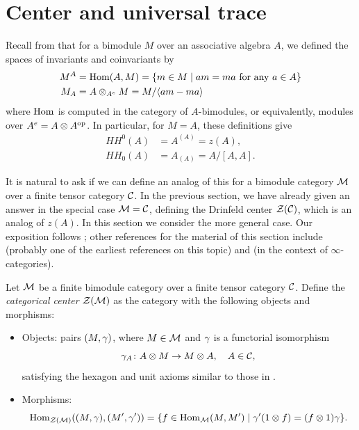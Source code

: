 \section{Center and universal trace}\label{s:cat-trace}
Recall from  that for a bimodule $M$ over an associative
algebra $A$, we defined the spaces of invariants and coinvariants by
\begin{equation}
  \begin{aligned}
    M^{A}&=\operatorname{Hom}(A,M)=\{m\in M\; | \; am=ma \text{ for any } a\in A\}\\
    M_{A}&=A\otimes_{A^e} M = M/\langle am-ma\rangle
  \end{aligned}
\end{equation}
where $\operatorname{Hom}$ is computed in the category of $A$-bimodules, or equivalently,
modules over $A^e=A\otimes A^{\mathrm{op}}$. In particular, for $M=A$, these definitions
give
\begin{align*}
  HH^0(A)&=A^{(A)}=z(A),\\
  HH_0(A)&=A_{(A)}= A/[A,A].
\end{align*}

It is natural to ask if we can define an analog of this for a bimodule category
$\mathcal{M}$ over a finite tensor category $\mathcal{C}$. In the previous section, we have
already given an answer in the special case $\mathcal{M}=\mathcal{C}$, defining the Drinfeld
center $\mathcal{Z}(\mathcal{C})$, which is an analog of $z(A)$. In this section we
consider the more general case. Our exposition follows
\cite{fuchs-schaumann-schweigert-trace}; other references for the material of
this section include \cite{greenough} (probably one of the earliest references
on this topic) and \cite[Section 5]{benzvi-francis-nadler} (in the context
of $\infty$-categories).

\begin{definition}\label{d:cat-center}
  Let $\mathcal{M}$ be a finite bimodule category over a finite tensor category
  $\mathcal{C}$. Define the \emph{categorical center}
  $\mathcal{Z}(\mathcal{M})$ as the category
  with the following objects and morphisms:
    \begin{itemize}
      \item Objects: pairs $(M, \gamma)$, where $M\in \mathcal{M}$ and $\gamma$ is a
      functorial isomorphism
      $$
        \gamma_A\colon A\otimes M\to M\otimes A, \quad A\in \mathcal{C},
      $$
      satisfying the hexagon and unit axioms similar to those in
      .
      \item Morphisms:
      $$
      \operatorname{Hom}_{\mathcal{Z}(\mathcal{M})}((M, \gamma), (M', \gamma'))
        =\{f \in \operatorname{Hom}_{\mathcal{M}}(M,M')\; | \; \gamma' (1 \otimes f) =(f\otimes 1) \gamma\}.
      $$
    \end{itemize}
  \end{definition}

